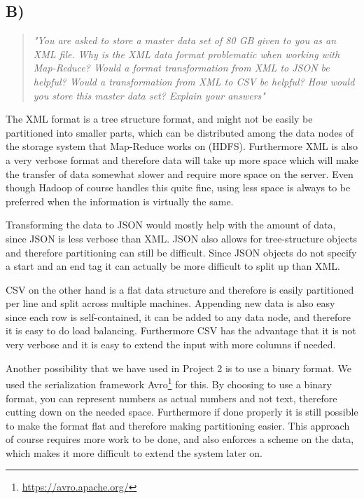 \subsection{B)}
\begin{quote}
		\textit{"You	are	asked	to	store	a	master	data	set	of	80	GB	given	to	you	as	an	XML	file.	Why	is	the	XML	data	format	problematic	when	working	with	Map-Reduce?	Would	a	format	transformation	from	XML	to	JSON	be	helpful?	Would	a	transformation	from	XML	to	CSV	be	helpful?	How	would	you	store	this	master	data	set?	Explain	your	answers"}
\end{quote}
The XML format is a tree structure format, and might not be easily be partitioned into smaller parts, which can be distributed among the data nodes of the storage system that Map-Reduce works on (HDFS). Furthermore XML is also a very verbose format and therefore data will take up more space which will make the transfer of data somewhat slower and require more space on the server. Even though Hadoop of course handles this quite fine, using less space is always to be preferred when the information is virtually the same. 

Transforming the data to JSON would mostly help with the amount of data, since JSON is less verbose than XML. JSON also allows for tree-structure objects and therefore partitioning can still be difficult. Since JSON objects do not specify a start and an end tag it can actually be more difficult to split up than XML. 

\newpar CSV on the other hand is a flat data structure and therefore is easily partitioned per line and split across multiple machines. Appending new data is also easy since each row is self-contained, it can be added to any data node, and therefore it is easy to do load balancing. Furthermore CSV has the advantage that it is not very verbose and it is easy to extend the input with more columns if needed.

Another possibility that we have used in Project 2 is to use a binary format. We used the serialization framework Avro\footnote{\url{https://avro.apache.org/}} for this. By choosing to use a binary format, you can represent numbers as actual numbers and not text, therefore cutting down on the needed space. Furthermore if done properly it is still possible to make the format flat and therefore making partitioning easier. This approach of course requires more work to be done, and also enforces a scheme on the data, which makes it more difficult to extend the system later on.


